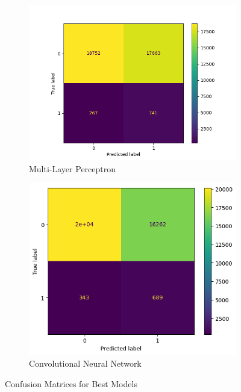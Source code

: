 \documentclass[a4paper,11pt]{report}
\begin{document}
\begin{figure}[h]
\begin{subfigure}[b]{0.52\textwidth}
        \includegraphics[width=\textwidth]{images/MLP_S3_neg_CM.png}
        \caption{Multi-Layer Perceptron}
        \label{fig:cm_mlp}
    \end{subfigure}
    \hfill
    \begin{subfigure}[b]{0.43\textwidth}
        \includegraphics[width=\textwidth]{images/cm_cnn_neg10.png}
        \caption{Convolutional Neural Network}
        \label{fig:cm_cnn}
    \end{subfigure}
    \caption{Confusion Matrices for Best Models}
    \label{fig:cm}
\end{figure}
\end{document}
